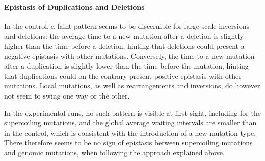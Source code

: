 \paragraph{Epistasis of Duplications and Deletions}
In the control, a faint pattern seems to be discernible for large-scale inversions and deletions: the average time to a new mutation after a deletion is slightly higher than the time before a deletion, hinting that deletions could present a negative epistasis with other mutations.
Conversely, the time to a new mutation after a duplication is slightly lower than the time before the mutation, hinting that duplications could on the contrary present positive epistasis with other mutations.
Local mutations, as well as rearrangements and inversions, do however not seem to swing one way or the other.

In the experimental runs, no such pattern is visible at first sight, including for the supercoiling mutations, and the global average waiting intervals are smaller than in the control, which is consistent with the introduction of a new mutation type.
There therefore seems to be no sign of epistasis between supercoiling mutations and genomic mutations, when following the approach explained above.

